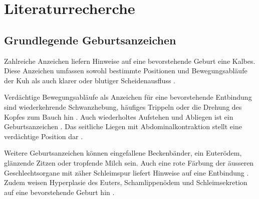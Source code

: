 \section{Literaturrecherche}
\subsection{Grundlegende Geburtsanzeichen}

Zahlreiche Anzeichen liefern Hinweise auf eine bevorstehende Geburt eine Kalbes. Diese Anzeichen umfassen sowohl bestimmte Positionen und Bewegungsabläufe der Kuh als auch klarer oder blutiger Scheidenausfluss \citep[S. 4847]{Lange2017}.

Verdächtige Bewegungsabläufe als Anzeichen für eine bevorstehende Entbindung sind wiederkehrende Schwanzhebung, häufiges Trippeln oder die Drehung des Kopfes zum Bauch hin \citep[S. 4847]{Lange2017}. Auch wiederholtes Aufstehen und Abliegen ist ein Geburtsanzeichen \citep[S. 352]{Saint-Dizier2015}. Das seitliche Liegen mit Abdominalkontraktion stellt eine verdächtige Position dar \citep[S. 4847]{Lange2017}. 

Weitere Geburtsanzeichen können eingefallene Beckenbänder, ein Euterödem, glänzende Zitzen oder tropfende Milch sein. Auch eine rote Färbung der  äusseren Geschlechtsorgane mit zäher Schleimspur liefert Hinweise auf eine Entbindung \citep[S. 6]{Traulsen2013}. Zudem weisen Hyperplasie des Euters, Schamlippenödem und Schleimsekretion auf eine bevorstehende Geburt hin \citep[S. 178]{Streyl2011}.


